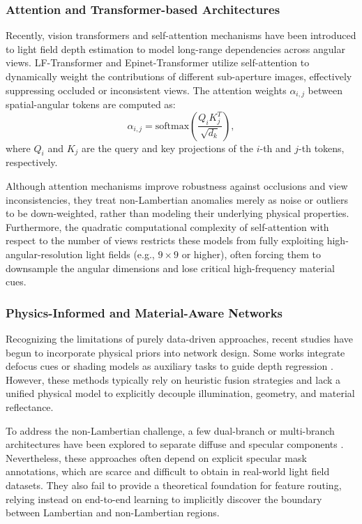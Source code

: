 \subsubsection{Attention and Transformer-based Architectures}
Recently, vision transformers and self-attention mechanisms have been introduced to light field depth estimation to model long-range dependencies across angular views. LF-Transformer \cite{liang2022light} and Epinet-Transformer \cite{chen2023epinet} utilize self-attention to dynamically weight the contributions of different sub-aperture images, effectively suppressing occluded or inconsistent views. The attention weights $\alpha_{i,j}$ between spatial-angular tokens are computed as:
\begin{equation}
\alpha_{i,j} = \text{softmax}\left(\frac{Q_i K_j^T}{\sqrt{d_k}}\right),
\label{eq:ch2_4}
\end{equation}
where $Q_i$ and $K_j$ are the query and key projections of the $i$-th and $j$-th tokens, respectively.

Although attention mechanisms improve robustness against occlusions and view inconsistencies, they treat non-Lambertian anomalies merely as noise or outliers to be down-weighted, rather than modeling their underlying physical properties. Furthermore, the quadratic computational complexity of self-attention with respect to the number of views restricts these models from fully exploiting high-angular-resolution light fields (e.g., $9 \times 9$ or higher), often forcing them to downsample the angular dimensions and lose critical high-frequency material cues.

\subsubsection{Physics-Informed and Material-Aware Networks}
Recognizing the limitations of purely data-driven approaches, recent studies have begun to incorporate physical priors into network design. Some works integrate defocus cues or shading models as auxiliary tasks to guide depth regression \cite{huang2021physics}. However, these methods typically rely on heuristic fusion strategies and lack a unified physical model to explicitly decouple illumination, geometry, and material reflectance. 

To address the non-Lambertian challenge, a few dual-branch or multi-branch architectures have been explored to separate diffuse and specular components \cite{zhang2022specular}. Nevertheless, these approaches often depend on explicit specular mask annotations, which are scarce and difficult to obtain in real-world light field datasets. They also fail to provide a theoretical foundation for feature routing, relying instead on end-to-end learning to implicitly discover the boundary between Lambertian and non-Lambertian regions.

